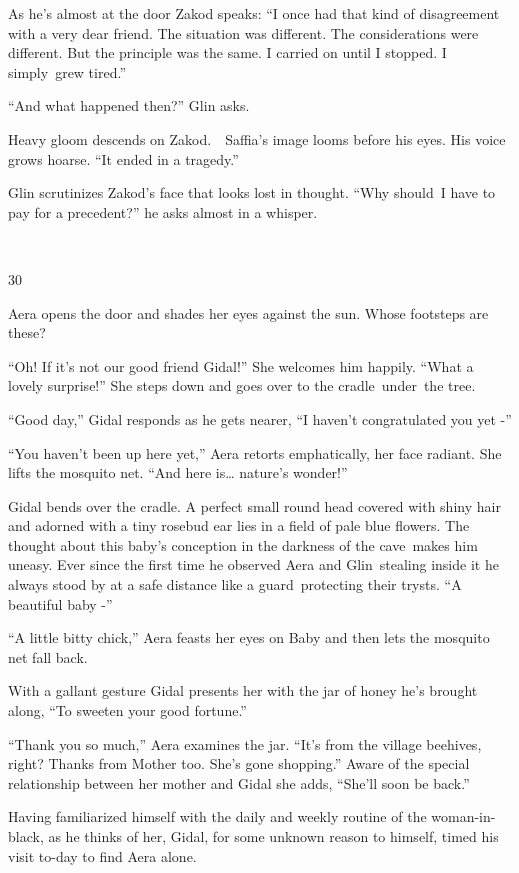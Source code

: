 \documentclass[twoside,11pt]{book}
\begin{document}
As he's almost at the door Zakod speaks: ``I once had that kind of disagreement with a very dear friend.
The situation was different. The considerations were different. But the principle was the same. I carried on until I
stopped. I simply{\ }grew tired.'' 

``And what happened then?'' Glin asks. 

Heavy gloom descends on Zakod.\ \ Saffia's image looms before his eyes. His voice grows hoarse. ``It ended
in a tragedy.'' 

Glin scrutinizes Zakod's face that looks lost in thought. ``Why
should{\ }I have to pay for a precedent?'' he asks almost in a
whisper.

~

30~~ 

Aera opens the door and shades her eyes against the sun. Whose footsteps are these? 

``Oh! If it's not our good friend Gidal!'' She welcomes him happily. ``What a
lovely surprise!'' She steps down and goes over to the
cradle~under{\ }the tree. 

``Good day,'' Gidal responds as he gets nearer, ``I haven't congratulated you yet
-'' 

``You haven't been up here yet,'' Aera retorts emphatically, her face radiant. She lifts the
mosquito net. ``And here is{\dots} nature's wonder!'' 

Gidal bends over the cradle. A perfect small round head covered with shiny hair and adorned with a tiny rosebud ear lies
in a field of pale blue flowers. The thought about this baby's conception in the darkness of the cave\ makes him
uneasy. Ever since the first time he observed Aera and Glin~stealing inside it he always stood by at a safe distance
like a guard\ protecting their trysts. ``A beautiful baby -'' 

``A little bitty chick,'' Aera feasts her eyes on Baby and then lets the mosquito net fall
back.\ 

With a gallant gesture Gidal presents her with the jar of honey he's brought along, ``To sweeten your good
fortune.'' 

``Thank you so much,'' Aera examines the jar. ``It's from the village beehives,
right? Thanks from Mother too. She's gone shopping.'' Aware of the special relationship between her mother
and Gidal she adds, ``She'll soon be back.'' 

Having familiarized himself with the daily and weekly routine of the woman-in-black, as he thinks of her, Gidal, for
some unknown reason to himself, timed his visit to-day to find Aera alone.
\end{document}
